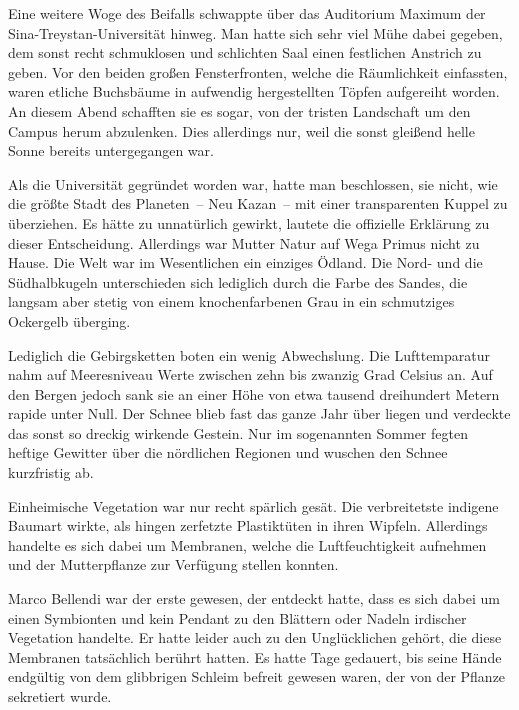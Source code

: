 Eine weitere Woge des Beifalls schwappte über das Auditorium Maximum der Sina-Treystan-Universität hinweg. Man hatte sich sehr viel Mühe dabei gegeben, dem sonst recht schmuklosen und schlichten Saal einen festlichen Anstrich zu geben. Vor den beiden großen Fensterfronten, welche die Räumlichkeit einfassten, waren etliche Buchsbäume in aufwendig hergestellten Töpfen aufgereiht worden. An diesem Abend schafften sie es sogar, von der tristen Landschaft um den Campus herum abzulenken. Dies allerdings nur, weil die sonst gleißend helle Sonne bereits untergegangen war.

\par

Als die Universität gegründet worden war, hatte man beschlossen, sie nicht, wie die größte Stadt des Planeten~-- Neu Kazan~-- mit einer transparenten Kuppel zu überziehen. Es hätte zu unnatürlich gewirkt, lautete die offizielle Erklärung zu dieser Entscheidung. Allerdings war Mutter Natur auf Wega Primus nicht zu Hause. Die Welt war im Wesentlichen ein einziges Ödland. Die Nord- und die Südhalbkugeln unterschieden sich lediglich durch die Farbe des Sandes, die langsam aber stetig von einem knochenfarbenen Grau in ein schmutziges Ockergelb überging.

\par

Lediglich die Gebirgsketten boten ein wenig Abwechslung. Die Lufttemparatur nahm auf Meeresniveau Werte zwischen zehn bis zwanzig Grad Celsius an. Auf den Bergen jedoch sank sie an einer Höhe von etwa tausend dreihundert Metern rapide unter Null. Der Schnee blieb fast das ganze Jahr über liegen und verdeckte das sonst so dreckig wirkende Gestein. Nur im sogenannten Sommer fegten heftige Gewitter über die nördlichen Regionen und wuschen den Schnee kurzfristig ab.

\par

Einheimische Vegetation war nur recht spärlich gesät. Die verbreitetste indigene Baumart wirkte, als hingen zerfetzte Plastiktüten in ihren Wipfeln. Allerdings handelte es sich dabei um Membranen, welche die Luftfeuchtigkeit aufnehmen und der Mutterpflanze zur Verfügung stellen konnten.

\par

Marco Bellendi war der erste gewesen, der entdeckt hatte, dass es sich dabei um einen Symbionten und kein Pendant zu den Blättern oder Nadeln irdischer Vegetation handelte. Er hatte leider auch zu den Unglücklichen gehört, die diese Membranen tatsächlich berührt hatten. Es hatte Tage gedauert, bis seine Hände endgültig von dem glibbrigen Schleim befreit gewesen waren, der von der Pflanze sekretiert wurde.

